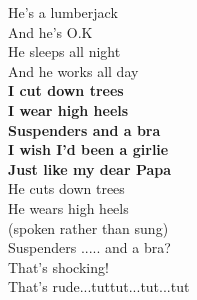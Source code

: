 \documentclass[a6paper, 10pt, twoside]{article}
\begin{document}
\begin{lyrics}
He's a lumberjack\\ 
And he's O.K\\ 
He sleeps all night\\ 
And he works all day
\vspace{5pt}\\ 
\textbf{I cut down trees\\ 
I wear high heels\\ 
Suspenders and a bra\\ 
I wish I'd been a girlie\\ 
Just like my dear Papa}
\vspace{5pt}\\ 
He cuts down trees\\ 
He wears high heels\\ 
(spoken rather than sung)\\ 
Suspenders ..... and a bra?\\ 
That's shocking!\\ 
That's rude...tuttut...tut...tut
\end{lyrics}
\end{document}

